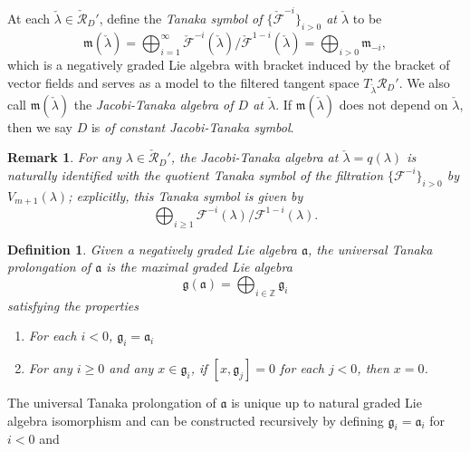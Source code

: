 \documentclass[11pt,letterpaper]{amsart}
\newtheorem{definition}[theorem]{Definition}
\newtheorem{remark}[theorem]{Remark}
\numberwithin{equation}{section}
\begin{document}
At each $\check{\lambda}\in \check{\mathcal{R}}_D'$, define the \emph{Tanaka symbol of $\{\check{\mathcal{F}}^{-i}\}_{i>0}$ at $\check{\lambda}$} to be
\begin{equation}
    \label{symbol def}
    \mathfrak{m}(\check{\lambda}) = \bigoplus_{i=1}^{\infty}\check{\mathcal{F}}^{-i}(\check{\lambda})/\check{\mathcal{F}}^{1-i}(\check{\lambda}) = \bigoplus_{i>0}\mathfrak{m}_{-i},
\end{equation}
which is a negatively graded Lie algebra with bracket induced by the bracket of vector fields and serves as a model to the filtered tangent space $T_{\check{\lambda}}\mathcal R_D'$. We also call $\mathfrak{m}(\check{\lambda})$ the \emph{Jacobi-Tanaka algebra of $D$ at $\check{\lambda}$}. If $\mathfrak{m}(\check{\lambda})$ does not depend on $\check\lambda$, then we say $D$ is \textit{of constant Jacobi-Tanaka symbol}.

\begin{remark}
    \label{Remark: Jacobi-Tanaka identification}
    For any $\lambda\in \check{\mathcal{R}}_D'$, the Jacobi-Tanaka algebra at $\check{\lambda}=q(\lambda)$ is naturally identified with the quotient Tanaka symbol of the filtration $\{\mathcal F^{-i}\}_{i>0}$ by $V_{m+1}(\lambda)$; explicitly, this Tanaka symbol is given by
    \begin{equation}
        \bigoplus_{i\geq 1} \mathcal F^{-i}(\lambda)/\mathcal F^{1-i}(\lambda).
    \end{equation}
\end{remark}

\begin{definition}
    \label{def: Tanaka prol}
    Given a negatively graded Lie algebra $\mathfrak{a}$, the \textit{universal Tanaka prolongation} of $\mathfrak{a}$ is the maximal graded Lie algebra 
    \[
        \mathfrak{g}(\mathfrak{a}) = \displaystyle{\bigoplus_{i\in\mathbb{Z}}\mathfrak{g}_i}
    \]
    satisfying the properties
    \begin{enumerate}[label=(\roman*)]
        \item For each $i<0$, $\mathfrak{g}_i = \mathfrak{a}_i$
        \item For any $i\geq0$ and any $x\in \mathfrak{g}_i$, if $[x,\mathfrak{g}_j] = 0$ for each $j<0$, then $x=0$.
    \end{enumerate} 
\end{definition}

The universal Tanaka prolongation of $\mathfrak{a}$ is unique up to natural graded Lie algebra isomorphism and can be constructed recursively by defining $\mathfrak{g}_{i} = \mathfrak{a}_{i}$ for $i<0$ and
\end{document}
